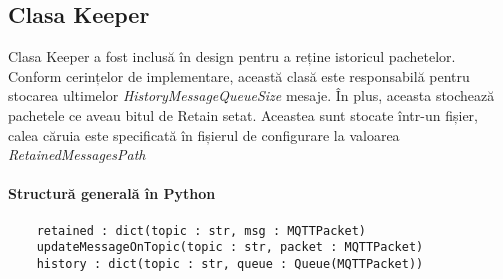 \documentclass{report}
\begin{document}
\subsection{Clasa Keeper}
Clasa Keeper a fost inclusă în design pentru a reține istoricul pachetelor. Conform cerințelor de implementare, această clasă este responsabilă pentru stocarea ultimelor \emph{HistoryMessageQueueSize} mesaje. În plus, aceasta stochează pachetele ce aveau bitul de Retain setat. Aceastea sunt stocate într-un fișier, calea căruia este specificată în fișierul de configurare la valoarea \emph{RetainedMessagesPath}
\paragraph{Structură generală în Python}
\begin{verbatim}
	retained : dict(topic : str, msg : MQTTPacket)
	updateMessageOnTopic(topic : str, packet : MQTTPacket)
	history : dict(topic : str, queue : Queue(MQTTPacket))
\end{verbatim}
\end{document}
